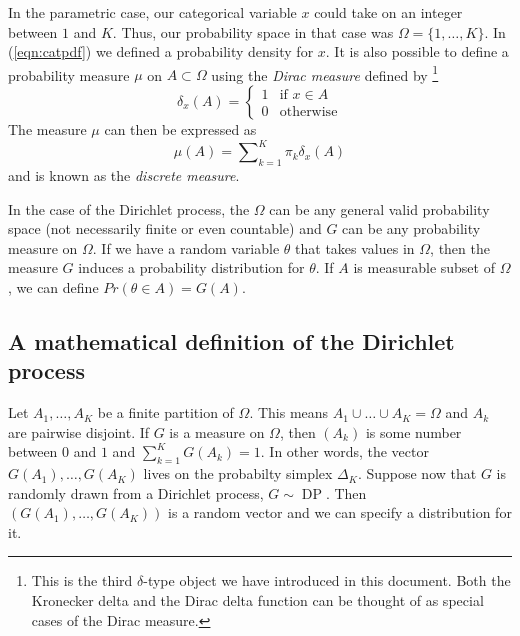\documentclass[final,3p,times,twocolumn]{elsarticle}
\DeclareMathOperator*{\DP}{DP}
\begin{document}
In the parametric case, our categorical variable $x$ could take on an integer between $1$ and $K$.
Thus, our probability space in that case was $\Omega = \{1,\dots,K\}$.
In (\ref{eqn:catpdf}) we defined a probability density for $x$.
It is also possible to define a probability measure $\mu$ on $A \subset \Omega$ using the \emph{Dirac measure} defined by
\footnote{This is the third $\delta$-type object we have introduced in this document.
Both the Kronecker delta and the Dirac delta function can be thought of as special cases of the Dirac measure.}
\begin{equation}
\label{eqn:diracmeasure}
\delta_x(A) = \left\{ \begin{array}{lr}
1 & \mbox{if $x \in A$} \\
0 & \mbox{otherwise}
\end{array} \right.
\end{equation}
The measure $\mu$ can then be expressed as 
\begin{equation}
\label{eqn:discretemeasure}
\mu(A) = \sum\nolimits_{k=1}^K \pi_k \delta_x (A)
\end{equation}
and is known as the \emph{discrete measure}. 

In the case of the Dirichlet process, the $\Omega$ can be any general valid probability space (not necessarily finite or even countable) and $G$ can be any probability measure on $\Omega$.
If we have a random variable $\theta$ that takes values in $\Omega$, then the measure $G$ induces a probability distribution for $\theta$.
If $A$ is measurable subset of $\Omega$, we can define $Pr(\theta \in A) = G(A)$.

\subsection{A mathematical definition of the Dirichlet process}
Let $A_1,\dots,A_K$ be a finite partition of $\Omega$.
This means $A_1 \cup \dots \cup A_K = \Omega$ and $A_k$ are pairwise disjoint.
If $G$ is a measure on $\Omega$, then $(A_k)$ is some number between $0$ and $1$ and $\sum_{k=1}^K G(A_k) = 1$.
In other words, the vector $G(A_1),\dots,G(A_K)$ lives on the probabilty simplex $\Delta_K$.
Suppose now that $G$ is randomly drawn from a Dirichlet process, $G \sim \DP$.
Then $(G(A_1),\dots,G(A_K))$ is a random vector and we can specify a distribution for it.
\end{document}
